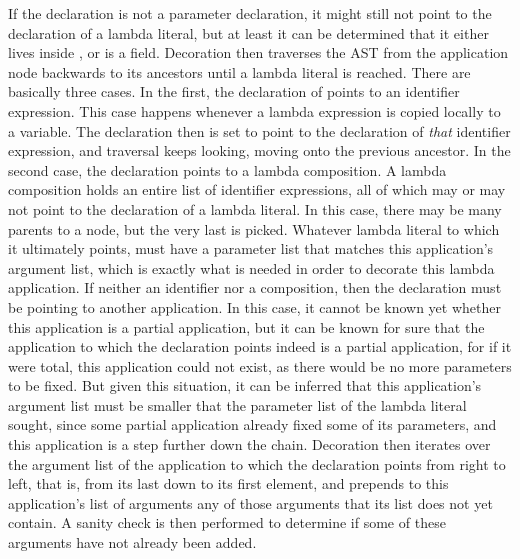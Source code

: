 If the  declaration is not a parameter declaration, it might still not point to the declaration of a lambda literal, but at least it can be determined that it either lives inside , or is a field. Decoration then traverses the AST from the application node backwards to its ancestors until a lambda literal is reached. There are basically three cases. In the first, the declaration of  points to an identifier expression. This case happens whenever a lambda expression is copied locally to a variable. The declaration then is set to point to the declaration of \emph{that} identifier expression, and traversal keeps looking, moving onto the previous ancestor. In the second case, the declaration points to a lambda composition. A lambda composition holds an entire list of identifier expressions, all of which may or may not point to the declaration of a lambda literal. In this case, there may be many parents to a node, but the very last is picked. Whatever lambda literal to which it ultimately points, must have a parameter list that matches this application's argument list, which is exactly what is needed in order to decorate this lambda application. If neither an identifier nor a composition, then the declaration must be pointing to another application. In this case, it cannot be known yet whether this application is a partial application, but it can be known for sure that the application to which the declaration points indeed is a partial application, for if it were total, this application could not exist, as there would be no more parameters to be fixed. But given this situation, it can be inferred that this application's argument list must be smaller that the parameter list of the lambda literal sought, since some partial application already fixed some of its parameters, and this application is a step further down the chain. Decoration then iterates over the argument list of the application to which the declaration points from right to left, that is, from its last down to its first element, and prepends to this application's list of arguments any of those arguments that its list does not yet contain. A sanity check is then performed to determine if some of these arguments have not already been added.


